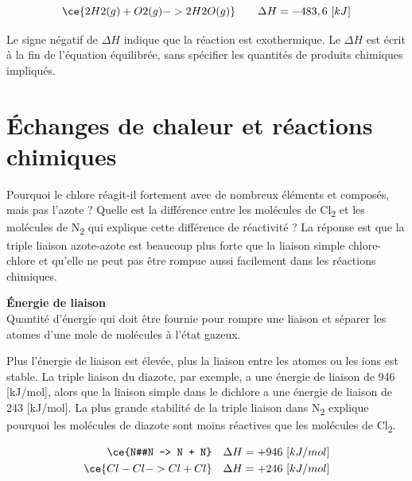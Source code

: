 \documentclass[
  11pt,
  a4paper,
  openany]{book}
\begin{document}
\[
\ce{2 H2(g) + O2(g) -> 2 H2O(g) } \qquad \Delta H = -483,6\ [kJ]
\]

Le signe négatif de \(\Delta H\) indique que la réaction est exothermique. Le \(\Delta H\) est écrit à la fin de l'équation équilibrée, sans spécifier les quantités de produits chimiques impliqués.

\section{Échanges de chaleur et réactions chimiques}\label{uxe9changes-de-chaleur-et-ruxe9actions-chimiques}

Pourquoi le chlore réagit-il fortement avec de nombreux éléments et composés, mais pas l'azote ? Quelle est la différence entre les molécules de Cl\textsubscript{2} et les molécules de N\textsubscript{2} qui explique cette différence de réactivité ? La réponse est que la triple liaison azote-azote est beaucoup plus forte que la liaison simple chlore-chlore et qu'elle ne peut pas être rompue aussi facilement dans les réactions chimiques.

\begin{tcolorbox}
\textbf{Énergie de liaison}\\
Quantité d'énergie qui doit être fournie pour rompre une liaison et séparer les atomes d'une mole de molécules à l'état gazeux.

\end{tcolorbox}

Plus l'énergie de liaison est élevée, plus la liaison entre les atomes ou les ions est stable. La triple liaison du diazote, par exemple, a une énergie de liaison de 946 {[}kJ/mol{]}, alors que la liaison simple dans le dichlore a une énergie de liaison de 243 {[}kJ/mol{]}. La plus grande stabilité de la triple liaison dans N\textsubscript{2} explique pourquoi les molécules de diazote sont moins réactives que les molécules de Cl\textsubscript{2}.

\[
\begin{split}
\ce{N#N -> N + N} \quad \Delta H = +946\ [kJ/mol] \\ 
\ce{Cl-Cl -> Cl + Cl} \quad \Delta H = +246\ [kJ/mol]
\end{split}
\]
\end{document}

